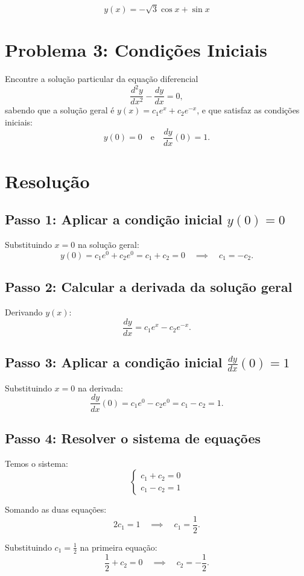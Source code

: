 \documentclass[12pt,a4paper]{article}
\begin{document}
\[
\boxed{y(x) = -\sqrt{3}\cos x + \sin x}
\]

\newpage

\section*{Problema 3: Condições Iniciais}
Encontre a solução particular da equação diferencial 
\[
\frac{d^2y}{dx^2} - \frac{dy}{dx} = 0,
\] 
sabendo que a solução geral é \(y(x) = c_1 e^x + c_2 e^{-x}\), e que satisfaz as condições iniciais:
\[
y(0) = 0 \quad \text{e} \quad \frac{dy}{dx}(0) = 1.
\]

\section*{Resolução}

\subsection*{Passo 1: Aplicar a condição inicial \(y(0) = 0\)}
Substituindo \(x = 0\) na solução geral:
\[
y(0) = c_1 e^{0} + c_2 e^{0} = c_1 + c_2 = 0 \quad \implies \quad c_1 = -c_2.
\]

\subsection*{Passo 2: Calcular a derivada da solução geral}
Derivando \(y(x)\):
\[
\frac{dy}{dx} = c_1 e^{x} - c_2 e^{-x}.
\]

\subsection*{Passo 3: Aplicar a condição inicial \(\frac{dy}{dx}(0) = 1\)}
Substituindo \(x = 0\) na derivada:
\[
\frac{dy}{dx}(0) = c_1 e^{0} - c_2 e^{0} = c_1 - c_2 = 1.
\]

\subsection*{Passo 4: Resolver o sistema de equações}
Temos o sistema:
\[
\begin{cases}
c_1 + c_2 = 0 \\
c_1 - c_2 = 1
\end{cases}
\]

Somando as duas equações:
\[
2c_1 = 1 \quad \implies \quad c_1 = \frac{1}{2}.
\]

Substituindo \(c_1 = \frac{1}{2}\) na primeira equação:
\[
\frac{1}{2} + c_2 = 0 \quad \implies \quad c_2 = -\frac{1}{2}.
\]
\end{document}
